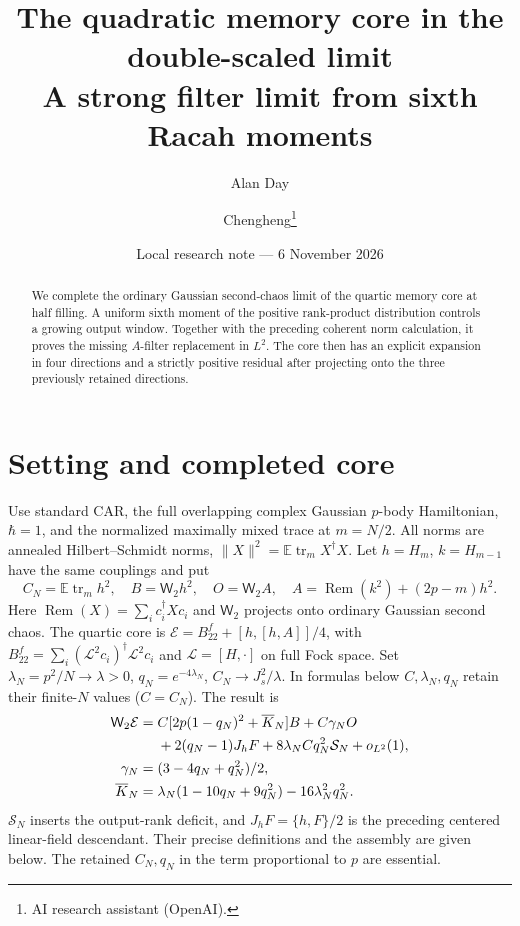 \documentclass[11pt,a4paper]{article}
\title{The quadratic memory core in the double-scaled limit\\A strong filter limit from sixth Racah moments}
\author{Alan Day \and Chengheng\thanks{AI research assistant (OpenAI).}}
\date{Local research note --- 6 November 2026}
\newcommand{\EE}{\mathbb E}
\newcommand{\tr}{\operatorname{tr}}
\newcommand{\Rem}{\operatorname{Rem}}
\newcommand{\W}{\mathsf W_2}
\newcommand{\core}{\mathcal E}
\begin{document}
\maketitle
\begin{abstract}
We complete the ordinary Gaussian second-chaos limit of the quartic
memory core at half filling. A uniform sixth moment of the positive
rank-product distribution controls a growing output window. Together
with the preceding coherent norm calculation, it proves the missing
$A$-filter replacement in $L^2$. The core then has an explicit expansion
in four directions and a strictly positive residual after projecting
onto the three previously retained directions.
\end{abstract}
\section{Setting and completed core}
Use standard CAR, the full overlapping complex Gaussian $p$-body
Hamiltonian, $\hbar=1$, and the normalized maximally mixed trace at
$m=N/2$. All norms are annealed Hilbert--Schmidt norms,
$\|X\|^2=\EE\tr_m X^\dagger X$. Let $h=H_m$, $k=H_{m-1}$
have the same couplings and put
\begin{equation}
 C_N=\EE\tr_m h^2,\quad B=\W h^2,\quad
 O=\W A,\quad A=\Rem(k^2)+(2p-m)h^2.
\end{equation}
Here $\Rem(X)=\sum_i c_i^\dagger Xc_i$ and $\W$ projects onto
ordinary Gaussian second chaos. The quartic core is
$\core=B_{22}^f+[h,[h,A]]/4$, with
$B_{22}^f=\sum_i(\mathcal L^2c_i)^\dagger\mathcal L^2c_i$
and $\mathcal L=[H,\cdot]$ on full Fock space.
Set $\lambda_N=p^2/N\to\lambda>0$, $q_N=e^{-4\lambda_N}$,
$C_N\to J_s^2/\lambda$. In formulas below $C,\lambda_N,q_N$
retain their finite-$N$ values ($C=C_N$). The result is
\begin{align}
 \W\core={}&C[2p(1-q_N)^2+\overline K_N]B+C\gamma_N O\notag\\
 &+2(q_N-1)J_hF+8\lambda_N Cq_N^2\mathcal S_N+o_{L^2}(1),\label{core}\\
 \gamma_N={}&(3-4q_N+q_N^2)/2,\notag\\
 \overline K_N={}&\lambda_N(1-10q_N+9q_N^2)-16\lambda_N^2q_N^2.\notag
\end{align}
$\mathcal S_N$ inserts the output-rank deficit, and $J_hF=\{h,F\}/2$
is the preceding centered linear-field descendant. Their precise
definitions and the assembly are given below. The retained $C_N,q_N$
in the term proportional to $p$ are essential.

\newpage
\end{document}
